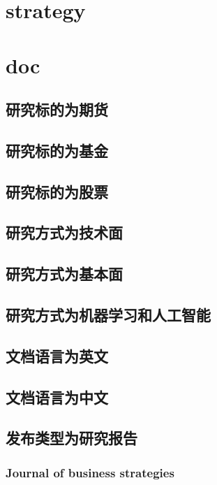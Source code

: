 \documentclass[11pt]{article}
\begin{document}
\section{strategy}
\label{sec:orgheadline55}

\section{doc}
\label{sec:orgheadline72}
\subsection{研究标的为期货}
\label{sec:orgheadline56}
\subsection{研究标的为基金}
\label{sec:orgheadline57}
\subsection{研究标的为股票}
\label{sec:orgheadline58}
\subsection{研究方式为技术面}
\label{sec:orgheadline59}
\subsection{研究方式为基本面}
\label{sec:orgheadline60}
\subsection{研究方式为机器学习和人工智能}
\label{sec:orgheadline61}
\subsection{文档语言为英文}
\label{sec:orgheadline62}
\subsection{文档语言为中文}
\label{sec:orgheadline63}
\subsection{发布类型为研究报告}
\label{sec:orgheadline71}
\subsubsection{Journal of business strategies}
\label{sec:orgheadline64}
\end{document}
